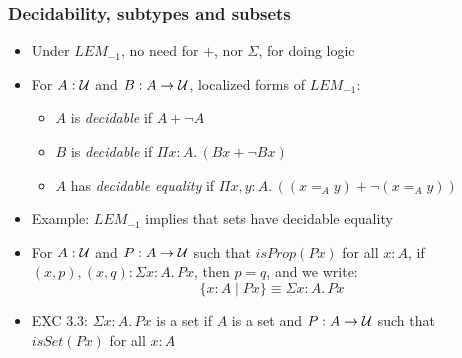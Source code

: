 \documentclass[handout]{beamer}
\newcommand{\depi}[3]{\Pi{#1{:}#2.\,#3}}
\newcommand{\sigm}[3]{\Sigma{#1{:}#2.\,#3}}
\newcommand{\subs}[3]{\{#1{:}#2\mid#3\}}
\newcommand{\UU}{{\cal U}}
\begin{document}
\frame
  {

    \frametitle{Decidability, subtypes and subsets}

    \begin{itemize}[<+->]
    \item Under $LEM_{-1}$, no need for $+$, nor $\Sigma$, for doing logic
    \item For $A:\UU$ and $B:A\to\UU$, localized forms of $LEM_{-1}$:
      \begin{itemize}[<+->]   
      \item $A$ is \emph{decidable} if $A+ \neg A$
      \item $B$ is \emph{decidable} if $\depi{x}{A}{(Bx + \neg Bx)}$
      \item $A$ has \emph{decidable equality} if $\depi{x,y}{A}{((x=_A y) + \neg (x=_A y))}$
      \end{itemize}
    \item Example: $LEM_{-1}$ implies that sets have decidable equality
    \item For $A:\UU$ and $P:A\to\UU$ such that $isProp(Px)$ for all $x:A$,
          if $(x,p),(x,q):\sigm{x}{A}{Px}$, then $p=q$, and we write:
          \[\subs{x}{A}{Px} \equiv \sigm{x}{A}{Px}\]
    \item EXC 3.3: $\sigm{x}{A}{Px}$ is a set if $A$ is a set and $P:A\to\UU$ such that 
           $isSet(Px)$ for all $x:A$
    \end{itemize}
  }

\newcommand{\brck}[1]{\trunc{}{#1}}
\newcommand{\trunc}[2]{\mathopen{}\left\Vert #2\right\Vert_{#1}\mathclose{}}
\newcommand{\bproj}[1]{\tproj{}{#1}}
\newcommand{\tproj}[2]{\mathopen{}\left|#2\right|_{#1}\mathclose{}}
\end{document}
